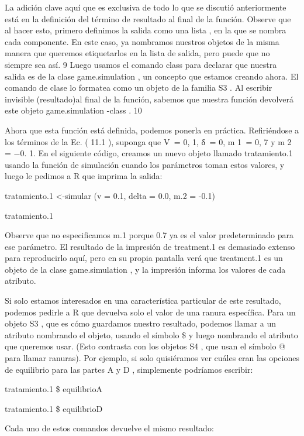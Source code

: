 \documentclass[
]{book}
\begin{document}
La adición clave aquí que es exclusiva de todo lo que se discutió anteriormente está en la definición del término de resultado al final de la función. Observe que al hacer esto, primero definimos la salida como una lista , en la que se nombra cada componente. En este caso, ya nombramos nuestros objetos de la misma manera que queremos etiquetarlos en la lista de salida, pero puede que no siempre sea así. 9 Luego usamos el comando class para declarar que nuestra salida es de la clase game.simulation , un concepto que estamos creando ahora. El comando de clase lo formatea como un objeto de la familia S3 . Al escribir invisible (resultado)al final de la función, sabemos que nuestra función devolverá este objeto game.simulation -class . 10

Ahora que esta función está definida, podemos ponerla en práctica. Refiriéndose a los términos de la Ec. ( 11.1 ), suponga que V  = 0, 1, δ  = 0, m 1  = 0, 7 y m 2  = −0. 1. En el siguiente código, creamos un nuevo objeto llamado tratamiento.1 usando la función de simulación cuando los parámetros toman estos valores, y luego le pedimos a R que imprima la salida:

tratamiento.1 \textless-simular (v = 0.1, delta = 0.0, m.2 = -0.1)

tratamiento.1

Observe que no especificamos m.1 porque 0.7 ya es el valor predeterminado para ese parámetro. El resultado de la impresión de treatment.1 es demasiado extenso para reproducirlo aquí, pero en su propia pantalla verá que treatment.1 es un objeto de la clase game.simulation , y la impresión informa los valores de cada atributo.

Si solo estamos interesados \hspace{0pt}\hspace{0pt}en una característica particular de este resultado, podemos pedirle a R que devuelva solo el valor de una ranura específica. Para un objeto S3 , que es cómo guardamos nuestro resultado, podemos llamar a un atributo nombrando el objeto, usando el símbolo \$ y luego nombrando el atributo que queremos usar. (Esto contrasta con los objetos S4 , que usan el símbolo @ para llamar ranuras). Por ejemplo, si solo quisiéramos ver cuáles eran las opciones de equilibrio para las partes A y D , simplemente podríamos escribir:

tratamiento.1 \$ equilibrioA

tratamiento.1 \$ equilibrioD

Cada uno de estos comandos devuelve el mismo resultado:
\end{document}

